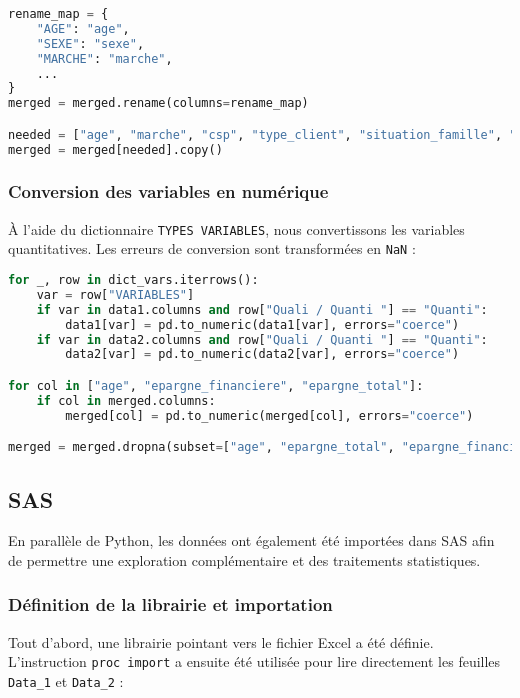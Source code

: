 \begin{lstlisting}[language=Python, caption=Renommage et sélection des variables]
rename_map = {
    "AGE": "age",
    "SEXE": "sexe",
    "MARCHE": "marche",
    ...
}
merged = merged.rename(columns=rename_map)

needed = ["age", "marche", "csp", "type_client", "situation_famille", "epargne_financiere", "epargne_total"]
merged = merged[needed].copy()
\end{lstlisting}

\subsubsection{Conversion des variables en numérique}
À l'aide du dictionnaire \texttt{TYPES VARIABLES}, nous convertissons les variables quantitatives. Les erreurs de conversion sont transformées en \texttt{NaN} :

\begin{lstlisting}[language=Python, caption=Conversion numérique et suppression des valeurs manquantes]
for _, row in dict_vars.iterrows():
    var = row["VARIABLES"]
    if var in data1.columns and row["Quali / Quanti "] == "Quanti":
        data1[var] = pd.to_numeric(data1[var], errors="coerce")
    if var in data2.columns and row["Quali / Quanti "] == "Quanti":
        data2[var] = pd.to_numeric(data2[var], errors="coerce")

for col in ["age", "epargne_financiere", "epargne_total"]:
    if col in merged.columns:
        merged[col] = pd.to_numeric(merged[col], errors="coerce")

merged = merged.dropna(subset=["age", "epargne_total", "epargne_financiere"])
\end{lstlisting}

\subsection{SAS}

En parallèle de Python, les données ont également été importées dans SAS afin de permettre une exploration complémentaire et des traitements statistiques. 

\subsubsection{Définition de la librairie et importation}
Tout d'abord, une librairie pointant vers le fichier Excel a été définie. L'instruction \texttt{proc import} a ensuite été utilisée pour lire directement les feuilles \texttt{Data\_1} et \texttt{Data\_2} :


